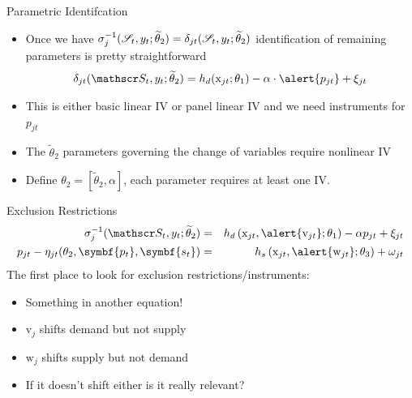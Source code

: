 \documentclass[aspectratio=169,11pt]{beamer}
\begin{document}
\begin{frame}{Parametric Identifcation}
\begin{itemize}
\item Once we have $\sigma_j^{-1}(\mathscr{S}_t,y_t;\widetilde{\theta}_2) = \delta_{jt}(\mathscr{S}_t,y_t;\widetilde{\theta}_2)$ identification of remaining parameters is pretty straightforward
\begin{eqnarray*}
\delta_{jt}(\calS_t,y_t;\widetilde{\theta}_2)=  h_d(\mathrm{x}_{jt};\theta_1)-  \alpha \cdot \alert{ p_{jt}} + \xi_{jt}
\end{eqnarray*}
\item This is either basic linear IV or panel linear IV and we need instruments for $p_{jt}$
\item The $\widetilde{\theta}_2$ parameters governing the change of variables require \alert{nonlinear IV}
\item Define $\theta_2 =  [\widetilde{\theta}_2, \alpha]$, each parameter requires at least one IV.
\end{itemize}
\end{frame}

\begin{frame}{Exclusion Restrictions}
\begin{eqnarray*}
    \sigma_j^{-1}(\calS_t,y_t;\widetilde{\theta}_2) &=&  h_d\left(\mathrm{x}_{jt}, \alert{\mathrm{v}_{jt}}; \theta_1 \right)  - \alpha p_{jt} + \xi_{jt}\\
    p_{jt} - \eta_{jt}(\theta_2,\symbf{p_t},\symbf{s_t}) &=&   h_s\left(\mathrm{x}_{jt},\alert{\mathrm{w}_{jt}};\theta_3 \right)+\omega_{jt}
\end{eqnarray*}
The first place to look for exclusion restrictions/instruments:
\begin{itemize}
\item Something in another equation!
\item $\mathrm{v}_j$ shifts demand but not supply
\item $\mathrm{w}_j$ shifts supply but not demand
\item If it doesn't shift either is it really relevant?
\end{itemize}
\end{frame}
\end{document}
